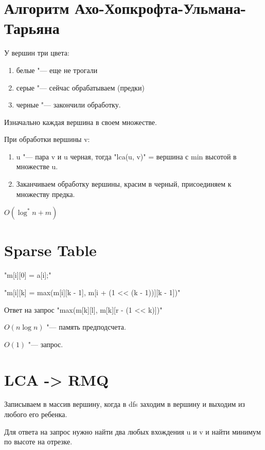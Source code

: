 \section{Алгоритм Ахо-Хопкрофта-Ульмана-Тарьяна}

У вершин три цвета:
\begin{enumerate}
\item белые "--- еще не трогали
\item серые "--- сейчас обрабатываем (предки)
\item черные "--- закончили обработку.
\end{enumerate}

Изначально каждая вершина в своем множестве. 

При обработки вершины v:
\begin{enumerate}
\item u "--- пара v и u черная, тогда
\cpp"lca(u, v)" = вершина с min высотой в множестве u.
\item Заканчиваем обработку вершины, красим в черный, присоединяем к множеству предка. 
\end{enumerate}

$O(\log^* n + m)$

\section{Sparse Table} 
\cpp"m[i][0] = a[i];"

\cpp"m[i][k] = max(m[i][k - 1], m[i + (1 << (k - 1))][k - 1])"

Ответ на запрос \cpp"max(m[k][l], m[k][r - (1 << k)])"

$O(n \log n)$ "--- память предподсчета. 

$O(1)$ "--- запрос.

\section{LCA -> RMQ}

Записываем в массив вершину, когда в dfs заходим в вершину и выходим из любого его ребенка.

Для ответа на запрос нужно найти два любых вхождения u и v и найти минимум по высоте на отрезке.
